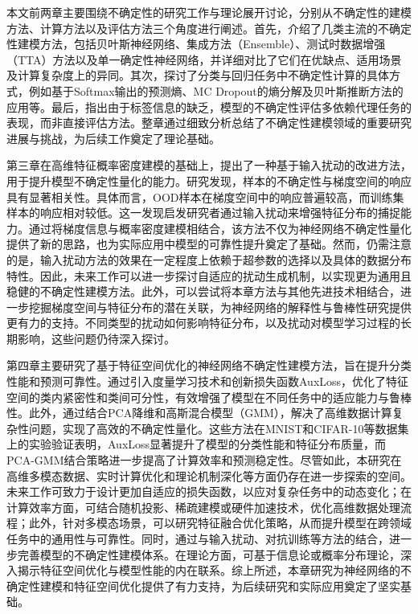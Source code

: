 \documentclass[type=master,twoside]{fduthesis}
\begin{document}
\begin{acknowledgements}
本文前两章主要围绕不确定性的研究工作与理论展开讨论，分别从不确定性的建模方法、计算方法以及评估方法三个角度进行阐述。首先，介绍了几类主流的不确定性建模方法，包括贝叶斯神经网络、集成方法（Ensemble）、测试时数据增强（TTA）方法以及单一确定性神经网络，并详细对比了它们在优缺点、适用场景及计算复杂度上的异同。其次，探讨了分类与回归任务中不确定性计算的具体方式，例如基于Softmax输出的预测熵、MC Dropout的熵分解及贝叶斯推断方法的应用等。最后，指出由于标签信息的缺乏，模型的不确定性评估多依赖代理任务的表现，而非直接评估方法。整章通过细致分析总结了不确定性建模领域的重要研究进展与挑战，为后续工作奠定了理论基础。

第三章在高维特征概率密度建模的基础上，提出了一种基于输入扰动的改进方法，用于提升模型不确定性量化的能力。研究发现，样本的不确定性与梯度空间的响应具有显著相关性。具体而言，OOD样本在梯度空间中的响应普遍较高，而训练集样本的响应相对较低。这一发现启发研究者通过输入扰动来增强特征分布的捕捉能力。通过将梯度信息与概率密度建模相结合，该方法不仅为神经网络不确定性量化提供了新的思路，也为实际应用中模型的可靠性提升奠定了基础。然而，仍需注意的是，输入扰动方法的效果在一定程度上依赖于超参数的选择以及具体的数据分布特性。因此，未来工作可以进一步探讨自适应的扰动生成机制，以实现更为通用且稳健的不确定性建模方法。此外，可以尝试将本章方法与其他先进技术相结合，进一步挖掘梯度空间与特征分布的潜在关联，为神经网络的解释性与鲁棒性研究提供更有力的支持。不同类型的扰动如何影响特征分布，以及扰动对模型学习过程的长期影响，这些问题仍待深入探讨。

第四章主要研究了基于特征空间优化的神经网络不确定性建模方法，旨在提升分类性能和预测可靠性。通过引入度量学习技术和创新损失函数AuxLoss，优化了特征空间的类内紧密性和类间可分性，有效增强了模型在不同任务中的适应能力与鲁棒性。此外，通过结合PCA降维和高斯混合模型（GMM），解决了高维数据计算复杂性问题，实现了高效的不确定性量化。这些方法在MNIST和CIFAR-10等数据集上的实验验证表明，AuxLoss显著提升了模型的分类性能和特征分布质量，而PCA-GMM结合策略进一步提高了计算效率和预测稳定性。尽管如此，本研究在高维多模态数据、实时计算优化和理论机制深化等方面仍存在进一步探索的空间。未来工作可致力于设计更加自适应的损失函数，以应对复杂任务中的动态变化；在计算效率方面，可结合随机投影、稀疏建模或硬件加速技术，优化高维数据处理流程；此外，针对多模态场景，可以研究特征融合优化策略，从而提升模型在跨领域任务中的通用性与可靠性。同时，通过与输入扰动、对抗训练等方法的结合，进一步完善模型的不确定性建模体系。在理论方面，可基于信息论或概率分布理论，深入揭示特征空间优化与模型性能的内在联系。综上所述，本章研究为神经网络的不确定性建模和特征空间优化提供了有力支持，为后续研究和实际应用奠定了坚实基础。


\end{acknowledgements}
\end{document}
